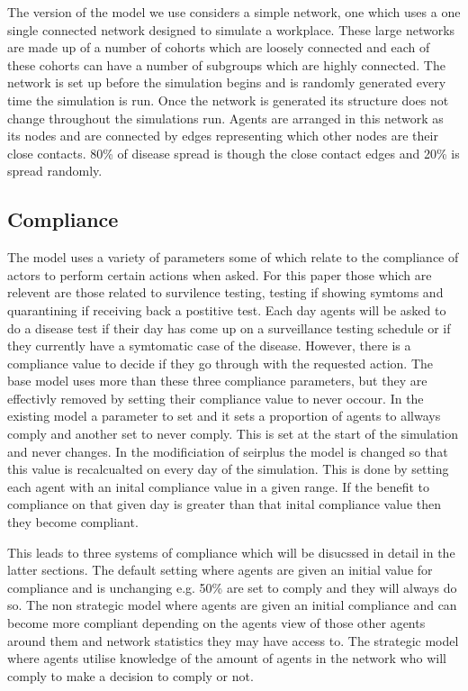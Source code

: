 \documentclass{article}
\begin{document}
The version of the model we use considers a simple network, one which uses a one single connected network designed to simulate a workplace. These large networks are made up of a number of cohorts which are loosely connected and each of these cohorts can have a number of subgroups which are highly connected. The network is set up before the simulation begins and is randomly generated every time the simulation is run. Once the network is generated its structure does not change throughout the simulations run.  Agents are arranged in this network as its nodes and are connected by edges representing which other nodes are their close contacts. 80\% of disease spread is though the close contact edges and 20\% is spread randomly.


\newpage



\subsection{Compliance}
The model uses a variety of parameters some of which relate to the compliance of actors to perform certain actions when asked. For this paper those which are relevent are those related to survilence testing, testing if showing symtoms and quarantining if receiving back a postitive test. Each day agents will be asked to do a disease test if their day has come up on a surveillance testing schedule or if they currently have a symtomatic case of the disease. However, there is a compliance value to decide if they go  through with the requested action. The base model uses more than these three compliance parameters, but they are effectivly removed by setting their compliance value to never occour. In the existing model a parameter to set and it sets a proportion of agents to allways comply and another set to never comply. This is set at the start of the simulation and never changes. In the modificiation of seirplus the model is changed so that this value is recalcualted on every day of the simulation. This is done by setting each agent with an inital compliance value in a given range. If the benefit to compliance on that given day is greater than that inital compliance value then they become compliant. \newline

This leads to three systems of compliance which will be disucssed in detail in the latter sections. The default setting where agents are given an initial value for compliance and is unchanging e.g. 50\% are set to comply and they will always do so. The non strategic model where agents are given an initial compliance and can become more compliant depending on the agents view of those other agents around them and network statistics they may have access to. The strategic model where agents utilise knowledge of the amount of agents in the network who will comply to make a decision to comply or not.\newline
\end{document}
